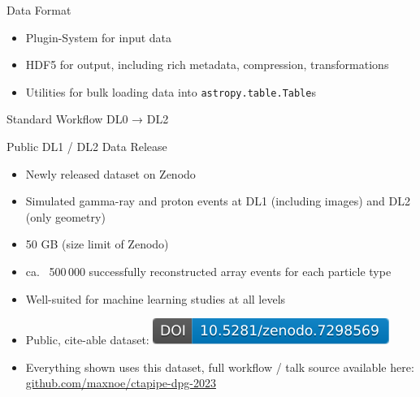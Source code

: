 \documentclass[aspectratio=1610, 9pt]{beamer}
\begin{document}
\begin{frame}{Data Format}
  \begin{itemize}
    \item Plugin-System for input data
    \item HDF5 for output, including rich metadata, compression, transformations
    \item Utilities for bulk loading data into  \texttt{astropy.table.Table}s
  \end{itemize}
\end{frame}

\begin{frame}{Standard Workflow DL0 → DL2}
\end{frame}

\begin{frame}{Public DL1 / DL2 Data Release}
  \begin{itemize}
    \item Newly released dataset on Zenodo
    \item Simulated gamma-ray and proton events at DL1 (including images) and DL2 (only geometry) 
    \item 50 GB (size limit of Zenodo)
    \item ca.~ 500\,000 successfully reconstructed array events for each particle type
    \item Well-suited for machine learning studies at all levels
    \item Public, cite-able dataset: \href{https://doi.org/10.5281/zenodo.7298568}{\includegraphics[height=2ex]{./images/public_data_zenodo.pdf}}

    \item Everything shown uses this dataset, full workflow / talk source available here: \\
      \href{https://github.com/maxnoe/ctapipe-dpg-2023}{github.com/maxnoe/ctapipe-dpg-2023}
  \end{itemize}
\end{frame}
\end{document}
